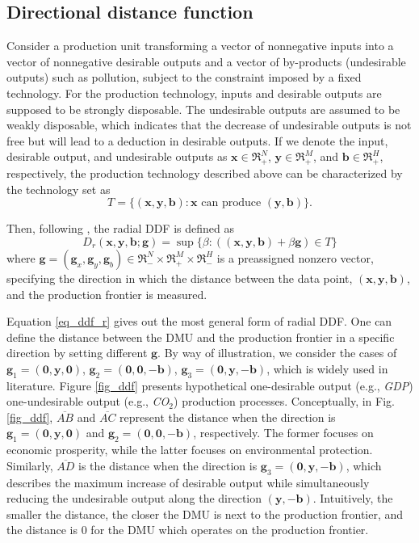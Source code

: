 \subsection{Directional distance function}
Consider a production unit transforming a vector of nonnegative inputs into a vector of nonnegative desirable outputs and a vector of by-products (undesirable outputs) such as pollution, subject to the constraint imposed by a fixed technology. For the production technology, inputs and desirable outputs are supposed to be strongly disposable. The undesirable outputs are assumed to be weakly disposable, which indicates that the decrease of undesirable outputs is not free but will lead to a deduction in desirable outputs.
If we denote the input, desirable output, and undesirable outputs as $\pmb{x} \in \Re _ + ^N$,  $\pmb{y} \in \Re _ + ^M$, and $\pmb{b} \in \Re _ + ^H$, respectively, the production technology described above can be characterized by the technology set as
\begin{equation}\label{eq_tech}
    T = \{ (\pmb{x},\pmb{y},\pmb{b}) : \pmb{x} \text{ can produce } (\pmb{y},\pmb{b}) \}.
\end{equation}

Then, following \cite{Chung1997}, the radial DDF is defined as
\begin{equation}\label{eq_ddf_r}
    D_r (\pmb{x},\pmb{y},\pmb{b};\pmb{g}) = \sup \{ \beta :((\pmb{x},\pmb{y},\pmb{b}) + \beta \pmb{g}) \in T  \} 
\end{equation}
where $\pmb{g} = (\pmb{g}_x,\pmb{g}_y, \pmb{g}_b) \in \Re _ - ^N \times \Re _ + ^M \times \Re _ - ^H$ is a preassigned nonzero vector, specifying the direction in which the distance between the data point, $(\pmb{x},\pmb{y},\pmb{b})$, and the production frontier is measured. 

Equation \eqref{eq_ddf_r} gives out the most general form of radial DDF. One can define the distance between the DMU and the production frontier in a specific direction by setting different $\pmb{g}$. By way of illustration, we consider the cases of  ${\pmb{g}_1} = (\pmb{0},\pmb{y},\pmb{0})$, ${\pmb{g}_2} = (\pmb{0},\pmb{0},-\pmb{b})$, ${\pmb{g}_3} = (\pmb{0},\pmb{y},-\pmb{b})$, which is widely used in literature. 
Figure \ref{fig_ddf} presents hypothetical one-desirable output (e.g., \textit{GDP}) one-undesirable output (e.g., \textit{CO$_2$}) production processes. 
Conceptually, in Fig. \ref{fig_ddf}, $\overline{\textit{AB}}$ and $\overline{\textit{AC}}$ represent the distance when the direction is ${\pmb{g}_1} = (\pmb{0},\pmb{y},\pmb{0})$ and ${\pmb{g}_2} = (\pmb{0},\pmb{0}, - \pmb{b})$, respectively. The former focuses on economic prosperity, while the latter focuses on environmental protection. Similarly, $\overline{\textit{AD}}$ is the distance when the direction is ${\pmb{g}_3} = (\pmb{0},\pmb{y}, - \pmb{b})$, which describes the maximum increase of desirable output while simultaneously reducing the undesirable output along the direction $(\pmb{y}, - \pmb{b})$. 
Intuitively, the smaller the distance, the closer the DMU is next to the production frontier, and the distance is 0 for the DMU which operates on the production frontier.

